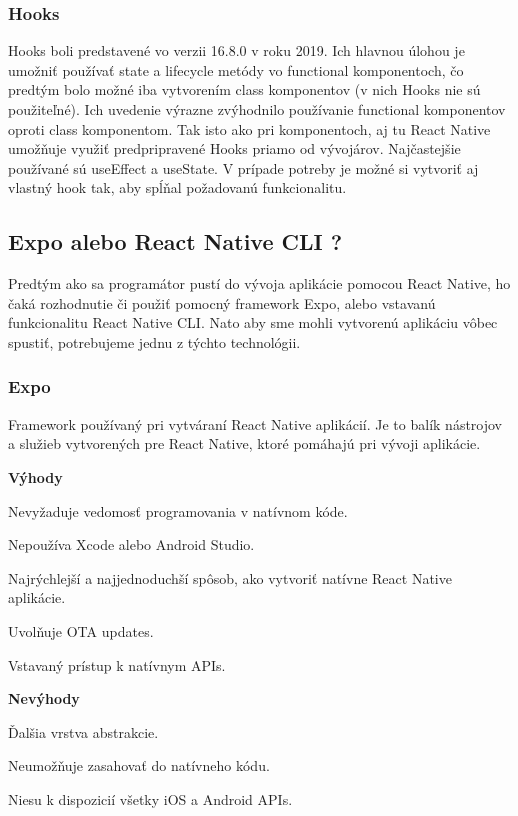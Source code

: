 \subsubsection{Hooks}
Hooks boli predstavené vo verzii 16.8.0 v roku 2019. Ich hlavnou úlohou je umožniť používať state a lifecycle metódy vo functional komponentoch, čo predtým bolo možné iba vytvorením class komponentov (v nich Hooks nie sú použiteľné). Ich uvedenie výrazne zvýhodnilo používanie functional komponentov oproti class komponentom. Tak isto ako pri komponentoch, aj tu React Native umožňuje využiť predpripravené Hooks priamo od vývojárov. Najčastejšie používané sú useEffect a useState. V prípade potreby je možné si vytvoriť aj vlastný hook tak, aby spĺňal požadovanú funkcionalitu. \\
\subsection{Expo alebo React Native CLI ?}
Predtým ako sa programátor pustí do vývoja aplikácie pomocou React Native, ho čaká rozhodnutie či použiť pomocný framework Expo, alebo vstavanú funkcionalitu React Native CLI. Nato aby sme mohli vytvorenú aplikáciu vôbec spustiť, potrebujeme jednu z týchto technológii. \\



\subsubsection{Expo}
Framework používaný pri vytváraní React Native aplikácií. Je to balík nástrojov a služieb vytvorených pre React Native, ktoré pomáhajú pri vývoji aplikácie. \newline

{\bf Výhody}
\begin{itemize}
{\item Nevyžaduje vedomosť programovania v natívnom kóde.}
{\item Nepoužíva Xcode alebo Android Studio.} 
{\item Najrýchlejší a najjednoduchší spôsob, ako vytvoriť natívne React Native aplikácie.}
{\item Uvolňuje OTA updates.} 
{\item Vstavaný prístup k natívnym APIs.}
\end{itemize}

{\bf Nevýhody}
\begin{itemize}
{\item Ďalšia vrstva abstrakcie.} 
{\item Neumožňuje zasahovať do natívneho kódu.}
{\item Niesu k dispozicií všetky iOS a Android APIs.} 
\end{itemize}
\bigskip

